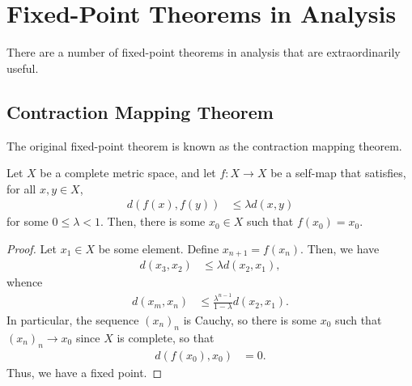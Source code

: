 \documentclass[10pt]{mypackage}
\begin{document}
\section{Fixed-Point Theorems in Analysis}%
There are a number of fixed-point theorems in analysis that are extraordinarily useful. 
\subsection{Contraction Mapping Theorem}%
The original fixed-point theorem is known as the contraction mapping theorem.
\begin{theorem}
  Let $X$ be a complete metric space, and let $f\colon X\rightarrow X$ be a self-map that satisfies, for all $x,y\in X$,
  \begin{align*}
    d\left( f(x),f(y) \right) &\leq \lambda d\left( x,y \right)
  \end{align*}
  for some $0 \leq \lambda < 1$. Then, there is some $x_0\in X$ such that $f\left(x_0\right) = x_0$.
\end{theorem}
\begin{proof}
  Let $x_1 \in X$ be some element. Define $x_{n+1} = f\left( x_n \right)$. Then, we have
  \begin{align*}
    d\left( x_3,x_2 \right) &\leq \lambda d\left( x_2,x_1 \right),
  \end{align*}
  whence
  \begin{align*}
    d\left( x_m,x_n \right) &\leq \frac{\lambda^{n-1}}{1-\lambda} d\left( x_2,x_1 \right).
  \end{align*}
  In particular, the sequence $\left( x_n \right)_n$ is Cauchy, so there is some $x_0$ such that $\left( x_n \right)_n\rightarrow x_0$ since $X$ is complete, so that
  \begin{align*}
    d\left( f\left( x_0 \right),x_0 \right) &= 0.
  \end{align*}
  Thus, we have a fixed point.
\end{proof}
\end{document}
